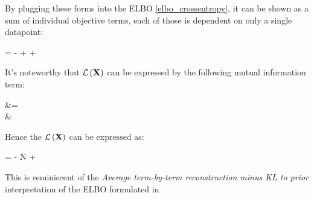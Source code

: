 By plugging these forms into the ELBO \eqref{elbo_crossentropy},
it can be shown as a sum of individual objective terms, each of those
is dependent on only a single datapoint:
\begin{nalign}
\elboX = \sumiN -\entropy{\qphizi,\pzi} + \entropy{\qphizi } + \expectqphizi{\log \pxicondi}
\end{nalign}

It's noteworthy that $\mathcal{L}\left(\mathbf{X}\right)$ can be expressed by the following mutual information term: 

\begin{nalign}
    \mutinf{\boldz}{\boldx} &= \expectx{\kl{\qphiz}{\pzonly}}\\
        & \approx {}\sumiN \kl{\qphizi}{\pzi}
\end{nalign}

Hence the $\mathcal{L}\left(\mathbf{X}\right)$ can be expressed as:

\begin{nalign}
\elboX = - N\cdot \mutinf{\boldz}{\boldx} + \sumiN \expectqphizi{\log \pxicondi}
\end{nalign}

This is reminiscent of the \emph{Average term-by-term reconstruction minus KL to prior}
interpretation of the ELBO formulated in \cite{surgery}

